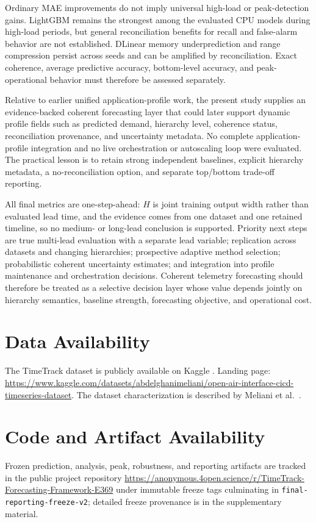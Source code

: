 \documentclass[a4paper,fleqn]{cas-dc}
\begin{document}
Ordinary {MAE} improvements do not imply universal high-load or peak-detection
gains.
LightGBM remains the strongest among the evaluated {CPU} models during
high-load periods, but general reconciliation benefits for recall and
false-alarm behavior are not established.
DLinear memory underprediction and range compression persist across seeds and
can be amplified by reconciliation.
Exact coherence, average predictive accuracy, bottom-level accuracy, and
peak-operational behavior must therefore be assessed separately.

Relative to earlier unified application-profile work, the present study
supplies an evidence-backed coherent forecasting layer that could later support
dynamic profile fields such as predicted demand, hierarchy level, coherence
status, reconciliation provenance, and uncertainty metadata.
No complete application-profile integration and no live orchestration or
autoscaling loop were evaluated.
The practical lesson is to retain strong independent baselines, explicit
hierarchy metadata, a no-reconciliation option, and separate top/bottom
trade-off reporting.

All final metrics are one-step-ahead: $H$ is joint training output width rather
than evaluated lead time, and the evidence comes from one dataset and one
retained timeline, so no medium- or long-lead conclusion is supported.
Priority next steps are true multi-lead evaluation with a separate lead
variable; replication across datasets and changing hierarchies; prospective
adaptive method selection; probabilistic coherent uncertainty estimates; and
integration into profile maintenance and orchestration decisions.
Coherent telemetry forecasting should therefore be treated as a selective
decision layer whose value depends jointly on hierarchy semantics, baseline
strength, forecasting objective, and operational cost.

\section*{Data Availability}
The TimeTrack dataset is publicly available on Kaggle
\cite{meliani2025timetrackkaggle}.
Landing page:
\url{https://www.kaggle.com/datasets/abdelghanimeliani/open-air-interface-cicd-timeseries-dataset}.
The dataset characterization is described by Meliani et al.\
\cite{meliani2025timetrack}.

\section*{Code and Artifact Availability}
Frozen prediction, analysis, peak, robustness, and reporting artifacts are
tracked in the public project repository
\url{https://anonymous.4open.science/r/TimeTrack-Forecasting-Framework-E369}
under immutable freeze tags culminating in
\texttt{final-reporting-\allowbreak freeze-v2}; detailed freeze provenance is in
the supplementary material.
\end{document}
